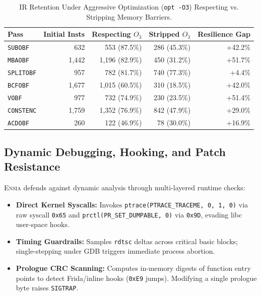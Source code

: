 \documentclass[conference]{IEEEtran}
\begin{document}
\begin{table}[h]
\centering
\caption{IR Retention Under Aggressive Optimization (\texttt{opt -O3}) Respecting vs. Stripping Memory Barriers.}
\label{tab:barrier_stripping}
\begin{tabular}{lrrrr}
\toprule
\textbf{Pass} & \textbf{Initial Insts} & \textbf{Respecting $O_3$} & \textbf{Stripped $O_3$} & \textbf{Resilience Gap} \\
\midrule
\texttt{SUBOBF}    & 632  & 553 (87.5\%) & 286 (45.3\%) & +42.2\% \\
\texttt{MBAOBF}    & 1,442 & 1,196 (82.9\%) & 450 (31.2\%) & +51.7\% \\
\texttt{SPLITOBF}  & 957  & 782 (81.7\%) & 740 (77.3\%) & +4.4\% \\
\texttt{BCFOBF}    & 1,677 & 1,015 (60.5\%) & 310 (18.5\%) & +42.0\% \\
\texttt{VOBF}      & 977  & 732 (74.9\%) & 230 (23.5\%) & +51.4\% \\
\texttt{CONSTENC}  & 1,759 & 1,352 (76.9\%) & 842 (47.9\%) & +29.0\% \\
\texttt{ACDOBF}    & 260   & 122 (46.9\%)   & 78 (30.0\%)  & +16.9\% \\
\bottomrule
\end{tabular}
\end{table}

\subsection{Dynamic Debugging, Hooking, and Patch Resistance}
\textsc{Ensia} defends against dynamic analysis through multi-layered runtime checks:
\begin{itemize}
    \item \textbf{Direct Kernel Syscalls:} Invokes \texttt{ptrace(PTRACE\_TRACEME, 0, 1, 0)} via raw syscall \texttt{0x65} and \texttt{prctl(PR\_SET\_DUMPABLE, 0)} via \texttt{0x9D}, evading libc user-space hooks.
    \item \textbf{Timing Guardrails:} Samples \texttt{rdtsc} deltas across critical basic blocks; single-stepping under GDB triggers immediate process abortion.
    \item \textbf{Prologue CRC Scanning:} Computes in-memory digests of function entry points to detect Frida/inline hooks (\texttt{0xE9} jumps). Modifying a single prologue byte raises \texttt{SIGTRAP}.
\end{itemize}
\end{document}
